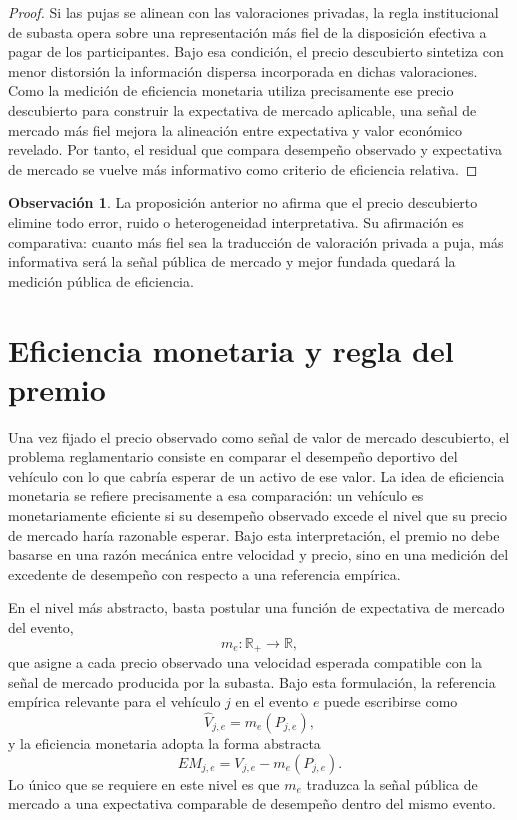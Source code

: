 \documentclass[11pt,a4paper]{article}
\theoremstyle{definition}
\newtheorem{observacion}{Observación}
\begin{document}
\begin{proof}
Si las pujas se alinean con las valoraciones privadas, la regla institucional de subasta opera sobre una representación más fiel de la disposición efectiva a pagar de los participantes. Bajo esa condición, el precio descubierto sintetiza con menor distorsión la información dispersa incorporada en dichas valoraciones. Como la medición de eficiencia monetaria utiliza precisamente ese precio descubierto para construir la expectativa de mercado aplicable, una señal de mercado más fiel mejora la alineación entre expectativa y valor económico revelado. Por tanto, el residual que compara desempeño observado y expectativa de mercado se vuelve más informativo como criterio de eficiencia relativa.
\end{proof}

\begin{observacion}
La proposición anterior no afirma que el precio descubierto elimine todo error, ruido o heterogeneidad interpretativa. Su afirmación es comparativa: cuanto más fiel sea la traducción de valoración privada a puja, más informativa será la señal pública de mercado y mejor fundada quedará la medición pública de eficiencia.
\end{observacion}

\section{Eficiencia monetaria y regla del premio}

Una vez fijado el precio observado como señal de valor de mercado descubierto, el problema reglamentario consiste en comparar el desempeño deportivo del vehículo con lo que cabría esperar de un activo de ese valor. La idea de eficiencia monetaria se refiere precisamente a esa comparación: un vehículo es monetariamente eficiente si su desempeño observado excede el nivel que su precio de mercado haría razonable esperar. Bajo esta interpretación, el premio no debe basarse en una razón mecánica entre velocidad y precio, sino en una medición del excedente de desempeño con respecto a una referencia empírica.

En el nivel más abstracto, basta postular una función de expectativa de mercado del evento,
\[
m_e:\mathbb{R}_{+}\to\mathbb{R},
\]
que asigne a cada precio observado una velocidad esperada compatible con la señal de mercado producida por la subasta. Bajo esta formulación, la referencia empírica relevante para el vehículo $j$ en el evento $e$ puede escribirse como
\[
\widehat V_{j,e}=m_e(P_{j,e}),
\]
y la eficiencia monetaria adopta la forma abstracta
\[
EM_{j,e}=V_{j,e}-m_e(P_{j,e}).
\]
Lo único que se requiere en este nivel es que $m_e$ traduzca la señal pública de mercado a una expectativa comparable de desempeño dentro del mismo evento.
\end{document}
